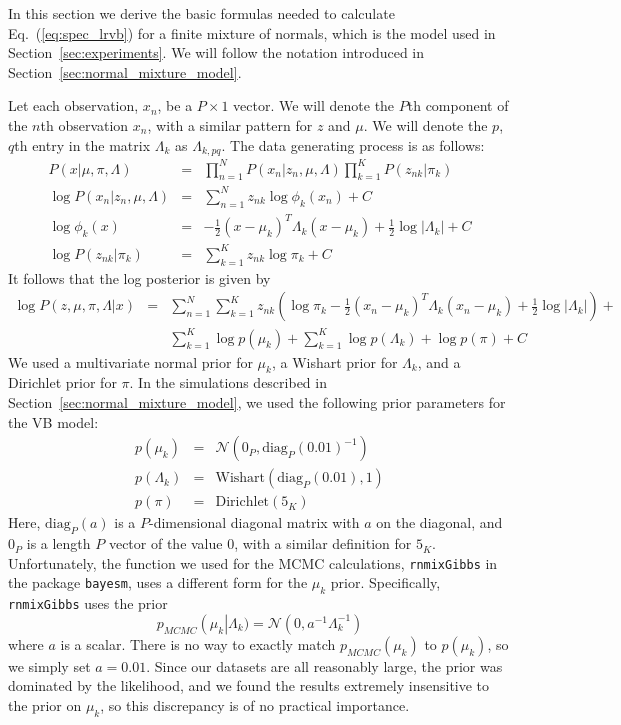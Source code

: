 \documentclass{article}\usepackage[]{graphicx}\usepackage[]{color}
\newcommand{\mysec}[1]{Section~\ref{sec:#1}}
\newcommand{\eq}[1]{Eq.~(\ref{eq:#1})}
\newcommand{\constant}{C} %
\begin{document}
In this section we derive the basic formulas needed to calculate \eq{spec_lrvb}
for a finite mixture of normals, which
is the model used in \mysec{experiments}.  We will
follow the notation introduced in \mysec{normal_mixture_model}.

Let each observation, $x_{n}$, be a $P\times1$ vector. We will denote
the $P$th component of the $n$th observation $x_{n}$, with a
similar pattern for $z$ and $\mu$. We will denote the $p$, $q$th
entry in the matrix $\Lambda_{k}$ as $\Lambda_{k,pq}$. The data
generating process is as follows:
%
\begin{eqnarray*}
P\left(x | \mu, \pi, \Lambda \right) &=&
  \prod_{n=1}^N P\left(x_{n}|z_{n},\mu,\Lambda \right)
  \prod_{k=1}^{K} P\left(z_{nk}|\pi_{k} \right)\\
\log P\left(x_{n}|z_{n},\mu,\Lambda\right) & = &
    \sum_{n=1}^{N}z_{nk}\log\phi_{k}(x_{n}) + \constant\\
\log\phi_{k}(x) & = & -\frac{1}{2}\left(x - \mu_{k}\right)^{T} \Lambda_{k}\left(x-\mu_{k}\right) +
    \frac{1}{2}\log\left|\Lambda_{k}\right|+ \constant\\
\log P(z_{nk}|\pi_{k}) & = & \sum_{k=1}^{K}z_{nk}\log\pi_{k} + \constant
\end{eqnarray*}
%
It follows that the log posterior is given by
%
\begin{eqnarray*}
\log P(z,\mu,\pi,\Lambda | x) & = & \sum_{n=1}^{N}\sum_{k=1}^{K}z_{nk}\left(\log\pi_{k}-\frac{1}{2}\left(x_{n}-\mu_{k}\right)^{T}\Lambda_{k}\left(x_{n}-\mu_{k}\right)+\frac{1}{2}\log\left|\Lambda_{k}\right|\right) + \\
  &  & \sum_{k=1}^{K} \log p(\mu_{k}) + \sum_{k=1}^{K} \log p(\Lambda_{k}) +
        \log p(\pi) + \constant
\end{eqnarray*}
%
We used a multivariate normal prior for $\mu_{k}$, a Wishart prior for
$\Lambda_{k}$, and a Dirichlet prior for $\pi$.  In the simulations described
in \mysec{normal_mixture_model}, we used the following prior parameters
for the VB model:
%
\begin{eqnarray*}
  p(\mu_{k}) &=& \mathcal{N}\left(0_P, \textrm{diag}_P(0.01)^{-1}\right) \\
  p(\Lambda_{k}) &=& \textrm{Wishart}(\textrm{diag}_P(0.01), 1)\\
  p(\pi) &=& \textrm{Dirichlet}(5_K)
\end{eqnarray*}
%
Here, $\textrm{diag}_P(a)$ is a $P$-dimensional diagonal matrix with $a$ on the
diagonal, and $0_P$ is a length $P$ vector of the value $0$, with a similar
definition for $5_K$. Unfortunately, the function we used for the MCMC
calculations, \texttt{rnmixGibbs} in the package \texttt{bayesm}, uses a
different form for the $\mu_{k}$ prior. Specifically, \texttt{rnmixGibbs} uses
the prior
%
$$
  p_{MCMC}\left(\mu_{k} \right \vert \Lambda_{k}) =
    \mathcal{N}(0, a^{-1} \Lambda_{k}^{-1})
$$
%
where $a$ is a scalar.  There is no way to exactly match
$p_{MCMC}(\mu_k)$ to $p(\mu_k)$, so we simply set $a=0.01$.
Since our datasets are all reasonably large, the prior was dominated by the
likelihood, and we found the results extremely insensitive to the prior
on $\mu_{k}$, so this discrepancy is of no practical importance.
\end{document}
